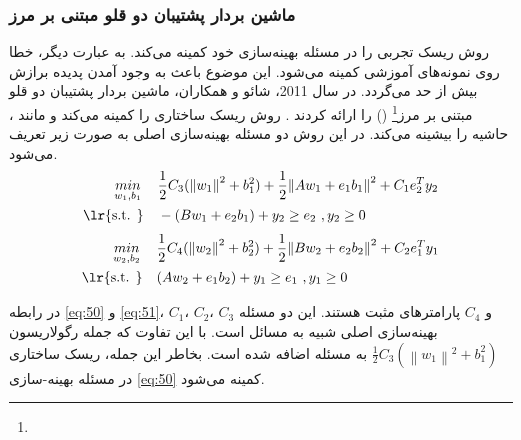 \subsubsection{ماشین بردار پشتیبان دو قلو مبتنی بر مرز}\label{sec:2:2:3:2}
روش  ریسک تجربی را در مسئله بهینه‌سازی خود کمینه می‌کند. به عبارت دیگر، خطا روی نمونه‌های آموزشی کمینه می‌شود. این موضوع باعث به وجود آمدن پدیده برازش بیش از حد می‌گردد. در سال 2011، شائو و همکاران، ماشین بردار پشتیبان دو قلو مبتنی بر مرز\footnote{}  () را ارائه کردند \cite{shao2011}. روش  ریسک ساختاری را کمینه می‌کند و مانند ، حاشیه را بیشینه می‌کند. در این روش دو مسئله بهینه‌سازی اصلی به صورت زیر تعریف می‌شود.
\begin{equation}
\begin{split}
   \underset{{{w}_{1}},{{b}_{1}}}{\mathop{min}}\,\quad  & \frac{1 }{2} C_{3} (\left\|w_{1}\right\|^{2}+b^{2}_{1}) + \frac{1}{2}{{\left\| A{{w}_{1}}+{{e}_{1}}{{b}_{1}} \right\|}^{2}}+{{C}_{1}}e_{2}^{T}{{y}_{2}}  \\
\textrm{\lr{s.t. }} \quad  & -(B{{w}_{1}}+{{e}_{2}}{{b}_{1}})+{{y}_{2}}\ge {{e}_{2}}\text{ },{{y}_{2}}\ge 0  \\
\end{split}
\label{eq:50}
\end{equation}
\begin{equation}
\begin{split}
\underset{{{w}_{2}},{{b}_{2}}}{\mathop{min}}\,\quad  & \frac{1 }{2} C_{4} (\left\|w_{2}\right\|^{2}+b^{2}_{2}) + \frac{1}{2}{{\left\| B{{w}_{2}}+{{e}_{2}}{{b}_{2}} \right\|}^{2}}+{{C}_{2}}e_{1}^{T}{{y}_{1}}  \\
\textrm{\lr{s.t. }} \quad  & (A{{w}_{2}}+{{e}_{1}}{{b}_{2}})+{{y}_{1}}\ge {{e}_{1}}\text{ },{{y}_{1}}\ge 0  \\
\end{split}
\label{eq:51}
\end{equation}

در رابطه \ref{eq:50} و \ref{eq:51}،  $C_1$،  $C_2$،  $C_3$ و  $C_4$ پارامترهای مثبت هستند. این دو مسئله بهینه‌سازی اصلی شبیه به مسائل  است. با این تفاوت که جمله رگولاریسون $\frac{1}{2}{{C}_{3}}({{\left\| {{w}_{1}} \right\|}^{2}}+b_{1}^{2})$ به مسئله اضافه شده است. بخاطر این جمله، ریسک ساختاری در مسئله بهینه-سازی \ref{eq:50} کمینه می‌شود.

